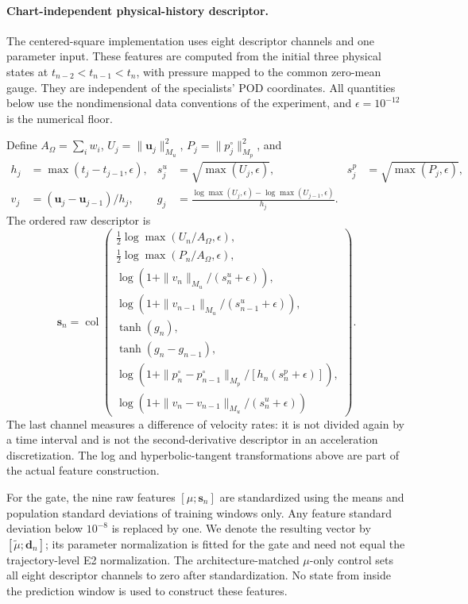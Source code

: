 \documentclass{article}
\begin{document}
\paragraph{Chart-independent physical-history descriptor.}
The centered-square implementation uses eight descriptor channels and one parameter input. These features are computed from the initial three physical states at $t_{n-2}<t_{n-1}<t_n$, with pressure mapped to the common zero-mean gauge. They are independent of the specialists' POD coordinates. All quantities below use the nondimensional data conventions of the experiment, and $\epsilon=10^{-12}$ is the numerical floor.

Define $A_\Omega=\sum_i w_i$, $U_j=\|\bm u_j\|_{M_u}^2$, $P_j=\|p_j^\circ\|_{M_p}^2$, and
\begin{align}
 h_j&=\max(t_j-t_{j-1},\epsilon),&
 s_j^u&=\sqrt{\max(U_j,\epsilon)},&
 s_j^p&=\sqrt{\max(P_j,\epsilon)},\\
 v_j&=(\bm u_j-\bm u_{j-1})/h_j,&
 g_j&=\frac{\log\max(U_j,\epsilon)-\log\max(U_{j-1},\epsilon)}{h_j}.
\end{align}
The ordered raw descriptor is
\begin{equation}
\bm s_n=\operatorname{col}\left(
\begin{array}{l}
 \tfrac12\log\max(U_n/A_\Omega,\epsilon),\\
 \tfrac12\log\max(P_n/A_\Omega,\epsilon),\\
 \log(1+\|v_n\|_{M_u}/(s_n^u+\epsilon)),\\
 \log(1+\|v_{n-1}\|_{M_u}/(s_{n-1}^u+\epsilon)),\\
 \tanh(g_n),\\
 \tanh(g_n-g_{n-1}),\\
 \log(1+\|p_n^\circ-p_{n-1}^\circ\|_{M_p}/[h_n(s_n^p+\epsilon)]),\\
 \log(1+\|v_n-v_{n-1}\|_{M_u}/(s_n^u+\epsilon))
\end{array}\right).
\label{eq:app_t2c_descriptor}
\end{equation}
The last channel measures a difference of velocity rates: it is not divided again by a time interval and is not the second-derivative descriptor in an acceleration discretization. The log and hyperbolic-tangent transformations above are part of the actual feature construction.

For the gate, the nine raw features $[\mu;\bm s_n]$ are standardized using the means and population standard deviations of training windows only. Any feature standard deviation below $10^{-8}$ is replaced by one. We denote the resulting vector by $[\widetilde\mu;\bm d_n]$; its parameter normalization is fitted for the gate and need not equal the trajectory-level E2 normalization. The architecture-matched $\mu$-only control sets all eight descriptor channels to zero after standardization. No state from inside the prediction window is used to construct these features.
\end{document}
